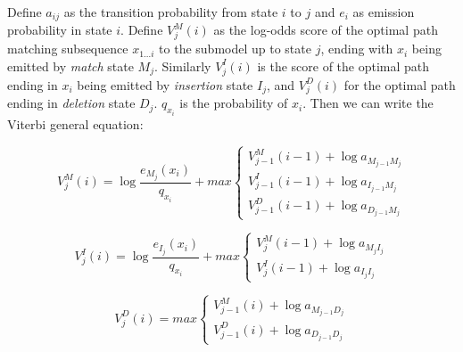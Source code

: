 
Define $a_{ij}$ as the transition probability from state $i$ to $j$ and $e_i$ as emission probability in state $i$.
Define $V_j^M(i)$ as the log-odds score of the optimal path matching subsequence $x_{1...i}$ to the submodel up to state $j$, ending with $x_i$ being emitted by \emph{match} state $M_j$. Similarly $V_j^I(i)$ is the score of the optimal path ending in $x_i$ being emitted by \emph{insertion} state $I_j$, and $V_j^D(i)$ for the optimal path ending in \emph{deletion} state $D_j$. $q_{x_i}$ is the probability of $x_i$. Then we can write the Viterbi general equation\citep{BioSeq}:

\begin{equation*}
   V_j^M(i) = \log\frac{e_{M_j}(x_i)}{q_{x_i}} + max 
   \begin{cases}
   V_{j-1}^M(i-1) + \log a_{M_{j-1}M_j}\\
   V_{j-1}^I(i-1) + \log a_{I_{j-1}M_j}\\
   V_{j-1}^D(i-1) + \log a_{D_{j-1}M_j}
   \end{cases}
\end{equation*}

\begin{equation*}
   V_j^I(i) = \log\frac{e_{I_j}(x_i)}{q_{x_i}} + max 
   \begin{cases}
   V_j^M(i-1) + \log {a}_{M_jI_j}\\
   V_j^I(i-1) + \log a_{I_jI_j}
   \end{cases} 
\end{equation*}

\begin{equation*}
   V_j^D(i) = max 
   \begin{cases}
   V_{j-1}^M(i) + \log a_{M_{j-1}D_j}\\
   V_{j-1}^D(i) + \log a_{D_{j-1}D_j}
   \end{cases}  
\end{equation*}

